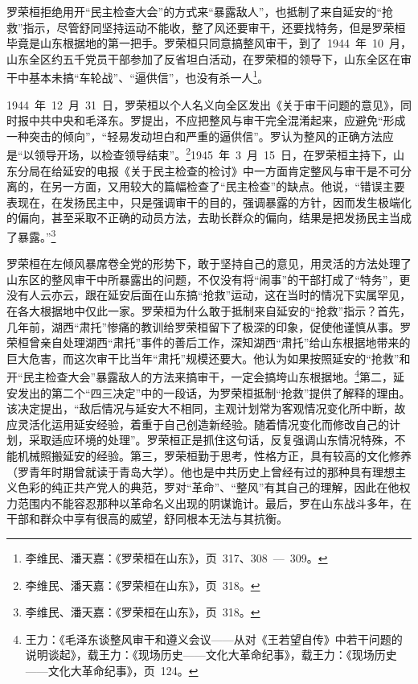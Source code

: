 罗荣桓拒绝用开“民主检查大会”的方式来“暴露敌人”，也抵制了来自延安的“抢救”指示，尽管舒同坚持运动不能收，整了风还要审干，还要找特务，但是罗荣桓毕竟是山东根据地的第一把手。罗荣桓只同意搞整风审干，到了~1944~年~10~月，山东全区约五千党员干部参加了反省坦白活动，在罗荣桓的领导下，山东全区在审干中基本未搞“车轮战”、“逼供信”，也没有杀一人\footnote{李维民、潘天嘉：《罗荣桓在山东》，页~317、308~—~309。}。

1944~年~12~月~31~日，罗荣桓以个人名义向全区发出《关于审干问题的意见》，同时报中共中央和毛泽东。罗提出，不应把整风与审干完全混淆起来，应避免“形成一种突击的倾向”，“轻易发动坦白和严重的逼供信”。罗认为整风的正确方法应是“以领导开场，以检查领导结束”。\footnote{李维民、潘天嘉：《罗荣桓在山东》，页~318。}1945~年~3~月~15~日，在罗荣桓主持下，山东分局在给延安的电报《关于民主检查的检讨》中一方面肯定整风与审干是不可分离的，在另一方面，又用较大的篇幅检查了“民主检查”的缺点。他说，“错误主要表现在，在发扬民主中，只是强调审干的目的，强调暴露的方针，因而发生极端化的偏向，甚至采取不正确的动员方法，去助长群众的偏向，结果是把发扬民主当成了暴露。”\footnote{李维民、潘天嘉：《罗荣桓在山东》，页~318。}

罗荣桓在左倾风暴席卷全党的形势下，敢于坚持自己的意见，用灵活的方法处理了山东区的整风审干中所暴露出的问题，不仅没有将“闹事”的干部打成了“特务”，更没有人云亦云，跟在延安后面在山东搞“抢救”运动，这在当时的情况下实属罕见，在各大根据地中仅此一家。罗荣桓为什么敢于抵制来自延安的“抢救”指示？首先，几年前，湖西“肃托”惨痛的教训给罗荣桓留下了极深的印象，促使他谨慎从事。罗荣桓曾亲自处理湖西“肃托”事件的善后工作，深知湖西“肃托”给山东根据地带来的巨大危害，而这次审干比当年“肃托”规模还要大。他认为如果按照延安的“抢救”和开“民主检查大会”暴露敌人的方法来搞审干，一定会搞垮山东根据地。\footnote{王力：《毛泽东谈整风审干和遵义会议——从对《王若望自传》中若干问题的说明谈起》，载王力：《现场历史——文化大革命纪事》，载王力：《现场历史——文化大革命纪事》，页~124。}第二，延安发出的第二个“四三决定”中的一段话，为罗荣桓抵制“抢救”提供了解释的理由。该决定提出，“敌后情况与延安大不相同，主观计划常为客观情况变化所中断，故应灵活化运用延安经验，着重于自己创造新经验。随着情况变化而修改自己的计划，采取适应环境的处理”。罗荣桓正是抓住这句话，反复强调山东情况特殊，不能机械照搬延安的经验。第三，罗荣桓勤于思考，性格方正，具有较高的文化修养（罗青年时期曾就读于青岛大学）。他也是中共历史上曾经有过的那种具有理想主义色彩的纯正共产党人的典范，罗对“革命”、“整风”有其自己的理解，因此在他权力范围内不能容忍那种以革命名义出现的阴谋诡计。最后，罗在山东战斗多年，在干部和群众中享有很高的威望，舒同根本无法与其抗衡。

